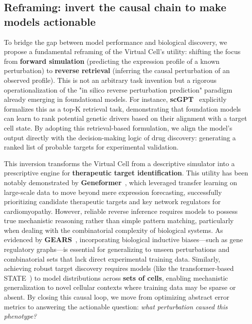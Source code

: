 \documentclass{article}
\begin{document}
\subsection{Reframing: invert the causal chain to make models actionable}

To bridge the gap between model performance and biological discovery, we propose a fundamental reframing of the Virtual Cell’s utility: shifting the focus from \textbf{forward simulation} (predicting the expression profile of a known perturbation) to \textbf{reverse retrieval} (inferring the causal perturbation of an observed profile). This is not an arbitrary task invention but a rigorous operationalization of the "in silico reverse perturbation prediction" paradigm already emerging in foundational models. For instance, \textbf{scGPT}~\cite{cui_scgpt_2024} explicitly formalizes this as a top-K retrieval task, demonstrating that foundation models can learn to rank potential genetic drivers based on their alignment with a target cell state. By adopting this retrieval-based formulation, we align the model’s output directly with the decision-making logic of drug discovery: generating a ranked list of probable targets for experimental validation.

This inversion transforms the Virtual Cell from a descriptive simulator into a prescriptive engine for \textbf{therapeutic target identification}. This utility has been notably demonstrated by \textbf{Geneformer}~\cite{theodoris_transfer_2023}, which leveraged transfer learning on large-scale data to move beyond mere expression forecasting, successfully prioritizing candidate therapeutic targets and key network regulators for cardiomyopathy. However, reliable reverse inference requires models to possess true mechanistic reasoning rather than simple pattern matching, particularly when dealing with the combinatorial complexity of biological systems. As evidenced by \textbf{GEARS}~\cite{roohani_predicting_2024}, incorporating biological inductive biases—such as gene regulatory graphs—is essential for generalizing to unseen perturbations and combinatorial sets that lack direct experimental training data. Similarly, achieving robust target discovery requires models (like the transformer-based STATE~\cite{adduri_predicting_nodate}) to model distributions across \textbf{sets of cells}, enabling mechanistic generalization to novel cellular contexts where training data may be sparse or absent. By closing this causal loop, we move from optimizing abstract error metrics to answering the actionable question: \textit{what perturbation caused this phenotype?}
\end{document}
